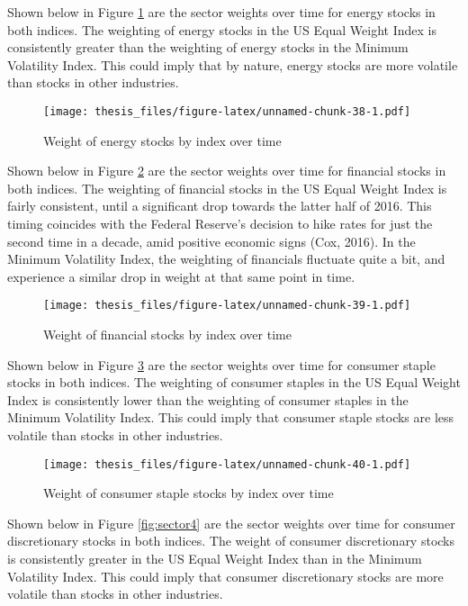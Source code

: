 \documentclass[12pt,twoside]{reedthesis}
\theoremstyle{definition}
\theoremstyle{definition}
\theoremstyle{definition}
\theoremstyle{remark}
\begin{document}
Shown below in Figure \ref{fig:sector1} are the sector weights over time
for energy stocks in both indices. The weighting of energy stocks in the
US Equal Weight Index is consistently greater than the weighting of
energy stocks in the Minimum Volatility Index. This could imply that by
nature, energy stocks are more volatile than stocks in other industries.
\begin{figure}[htbp]
\centering
\texttt{[image: thesis\_files/figure-latex/unnamed-chunk-38-1.pdf]}
\caption{\label{fig:unnamed-chunk-38}Weight of energy stocks by index over
time\label{fig:sector1}}
\end{figure}
\clearpage
Shown below in Figure \ref{fig:sector2} are the sector weights over time
for financial stocks in both indices. The weighting of financial stocks
in the US Equal Weight Index is fairly consistent, until a significant
drop towards the latter half of 2016. This timing coincides with the
Federal Reserve's decision to hike rates for just the second time in a
decade, amid positive economic signs (Cox, 2016). In the Minimum
Volatility Index, the weighting of financials fluctuate quite a bit, and
experience a similar drop in weight at that same point in time.
\begin{figure}[htbp]
\centering
\texttt{[image: thesis\_files/figure-latex/unnamed-chunk-39-1.pdf]}
\caption{\label{fig:unnamed-chunk-39}Weight of financial stocks by index
over time\label{fig:sector2}}
\end{figure}
\newline
Shown below in Figure \ref{fig:sector3} are the sector weights over time
for consumer staple stocks in both indices. The weighting of consumer
staples in the US Equal Weight Index is consistently lower than the
weighting of consumer staples in the Minimum Volatility Index. This
could imply that consumer staple stocks are less volatile than stocks in
other industries.
\begin{figure}[htbp]
\centering
\texttt{[image: thesis\_files/figure-latex/unnamed-chunk-40-1.pdf]}
\caption{\label{fig:unnamed-chunk-40}Weight of consumer staple stocks by
index over time\label{fig:sector3}}
\end{figure}
\clearpage
Shown below in Figure \ref{fig:sector4} are the sector weights over time
for consumer discretionary stocks in both indices. The weight of
consumer discretionary stocks is consistently greater in the US Equal
Weight Index than in the Minimum Volatility Index. This could imply that
consumer discretionary stocks are more volatile than stocks in other
industries.
\end{document}
